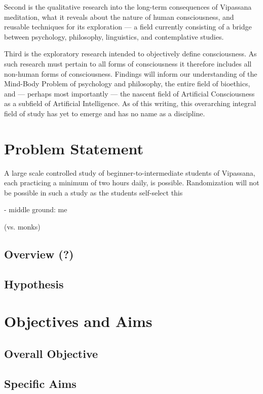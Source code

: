 \documentclass[a4paper, amsfonts, amssymb, amsmath, reprint, showkeys, nofootinbib, twoside]{revtex4-1}
\begin{document}
Second is the qualitative research into the long-term consequences of
Vipassana meditation, what it reveals about the nature of human consciousness, and
reusable techniques for its exploration --- a field currently consisting of a bridge
between psychology, philosophy, linguistics, and contemplative studies.

Third is the exploratory research intended to objectively define
consciousness. As such research must pertain to all forms of consciousness it
therefore includes all non-human forms of consciousness. Findings will inform our
understanding of the Mind-Body Problem of psychology and philosophy, the entire field
of bioethics, and --- perhaps most importantly --- the nascent field of Artificial
Consciousness as a subfield of Artificial Intelligence. \cite{hildt2019artificial} As of this
writing, this overarching integral field of study has yet to emerge and has no name
as a discipline.

\section{Problem Statement}

A large scale controlled study of beginner-to-intermediate
students of Vipassana, each practicing a minimum of two hours daily, is
possible. Randomization will not be possible in such a study as the students
self-select this

- middle ground: me

(vs. monks)

\subsection{Overview (?)}
\subsection{Hypothesis}

\section{Objectives and Aims}

\subsection{Overall Objective}
\subsection{Specific Aims}
\end{document}
